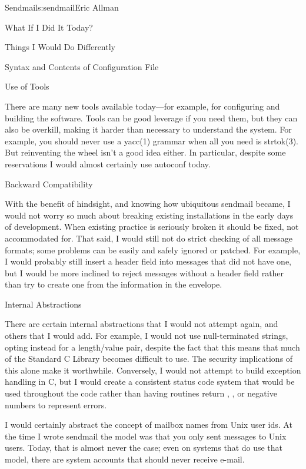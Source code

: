 \begin{aosachapter}{Sendmail}{s:sendmail}{Eric Allman}
\begin{aosasect1}{What If I Did It Today?}
\begin{aosasect2}{Things I Would Do Differently}
\begin{aosasect3}{Syntax and Contents of Configuration File}
\end{aosasect3}

\begin{aosasect3}{Use of Tools}

There are many new tools available today---for example, for
configuring and building the software. Tools can be good leverage if
you need them, but they can also be overkill, making it harder than
necessary to understand the system. For example, you should never use
a yacc(1) grammar when all you need is strtok(3). But reinventing the
wheel isn't a good idea either.  In particular, despite some
reservations I would almost certainly use autoconf today.

\end{aosasect3}

\begin{aosasect3}{Backward Compatibility}

With the benefit of hindsight, and knowing how ubiquitous sendmail
became, I would not worry so much about breaking existing
installations in the early days of development.  When existing
practice is seriously broken it should be fixed, not accommodated
for. That said, I would still not do strict checking of all message
formats; some problems can be easily and safely ignored or
patched. For example, I would probably still insert a 
header field into messages that did not have one, but I would be more
inclined to reject messages without a  header field rather than
try to create one from the information in the envelope.

\end{aosasect3}

\begin{aosasect3}{Internal Abstractions}

There are certain internal abstractions that I would not attempt
again, and others that I would add. For example, I would not use
null-terminated strings, opting instead for a length/value pair,
despite the fact that this means that much of the Standard C Library
becomes difficult to use. The security implications of this alone make
it worthwhile. Conversely, I would not attempt to build exception
handling in C, but I would create a consistent status code system that
would be used throughout the code rather than having routines return
, , or negative numbers to represent errors.

I would certainly abstract the concept of mailbox names from Unix user
ids. At the time I wrote sendmail the model was that you only sent
messages to Unix users. Today, that is almost never the case; even on
systems that do use that model, there are system accounts that should
never receive e-mail.


\end{aosasect3}
\end{aosasect2}
\end{aosasect1}
\end{aosachapter}
